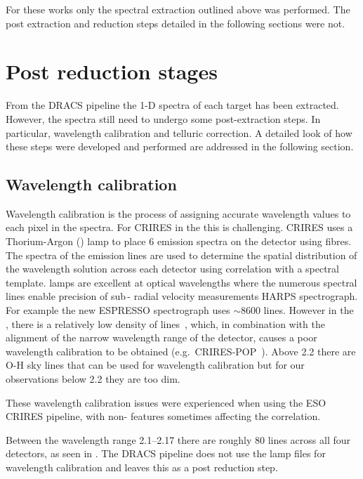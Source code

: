 For these works only the spectral extraction outlined above was performed. The post extraction and reduction steps detailed in the following sections were not.


\section{Post reduction stages}
\label{sec:posreduction}
From the {DRACS} pipeline the 1-D spectra of each target has been extracted. However, the spectra still need to undergo some post-extraction steps. In particular, wavelength calibration and telluric correction. A detailed look of how these steps were developed and performed are addressed in the following section.

\subsection{Wavelength calibration}
\label{subsec:wavecalib}

Wavelength calibration is the process of assigning accurate wavelength values to each pixel in the spectra. For {CRIRES} in the \nir{} this is challenging.
{CRIRES} uses a Thorium-Argon (\thar) lamp to place 6 emission spectra on the detector using fibres.
The spectra of the \thar{} emission lines are used to determine the spatial distribution of the wavelength solution across each detector using correlation with a spectral template.
\thar{} lamps are excellent at optical wavelengths where the numerous spectral lines enable precision of sub\,-\mps{} radial velocity measurements HARPS spectrograph. For example the new ESPRESSO spectrograph uses \(\sim8600\) \thar{} lines.
However in the \nir{}, there is a relatively low density of \thar{} lines~\citep{kerber_laboratory_2009}, which, in combination with the alignment of the narrow wavelength range of the detector, causes a poor wavelength calibration to be obtained (e.g.\ {CRIRES}-POP~\citep{nicholls_crirespop_2017}).
Above 2.2\um{} there are {O-H} sky lines that can be used for wavelength calibration but for our observations below 2.2\um{} they are too dim.

These wavelength calibration issues were experienced when using the {ESO} {CRIRES} pipeline, with non-\thar{} features sometimes affecting the correlation.

Between the wavelength range 2.1--2.17\um{} there are roughly 80 \thar{} lines across all four detectors, as seen in .
The {DRACS} pipeline does not use the \thar{} lamp files for wavelength calibration and leaves this as a post reduction step.

